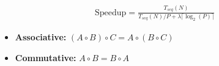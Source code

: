 \documentclass[../main.tex]{subfiles}
\begin{document}
\begin{align*}
	\text{Speedup} = \frac{T_{seq}(N)}{T_{seq}(N) / P + \lambda \lceil \log_2(P) \rceil}
\end{align*}

\begin{itemize}
	\item \textbf{Associative:} \((A \circ B) \circ C = A \circ (B \circ C)\)
	\item \textbf{Commutative:} \(A \circ B = B \circ A\)
\end{itemize}
\end{document}
